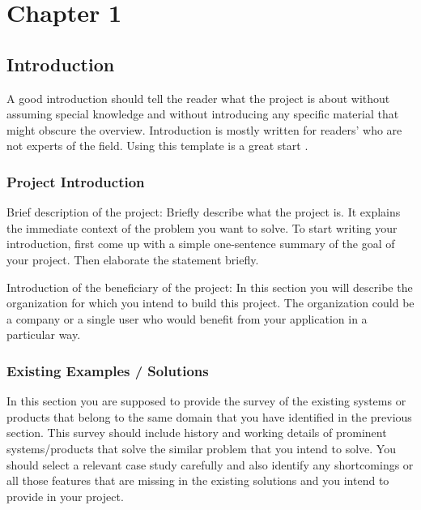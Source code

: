 



\setcounter{chapter}{1}
\setcounter{figure}{0}
\setcounter{table}{0}
\chapter*{Chapter 1}
\section{Introduction}

A good introduction should tell the reader what the project is about without assuming special knowledge and without introducing any specific material that might obscure the overview. Introduction is mostly written for readers' who are not experts of the field. Using this template is a great start \cite{logicalhammad}.

\subsection{Project Introduction}

Brief description of the project: Briefly describe what the project is. It explains the immediate context of the problem you want to solve. To start writing your introduction, first come up with a simple one-sentence summary of the goal of your project. Then elaborate the statement briefly.

Introduction of the beneficiary of the project: In this section you will describe the organization for which you intend to build this project. The organization could be a company or a single user who would benefit from your application in a particular way.


\subsection{Existing Examples / Solutions}

In this section you are supposed to provide the survey of the existing systems or products that belong to the same domain that you have identified in the previous section. This survey should include history and working details of prominent systems/products that solve the similar problem that you intend to solve. You should select a relevant case study carefully and also identify any shortcomings or all those features that are missing in the existing solutions and you intend to provide in your project.

